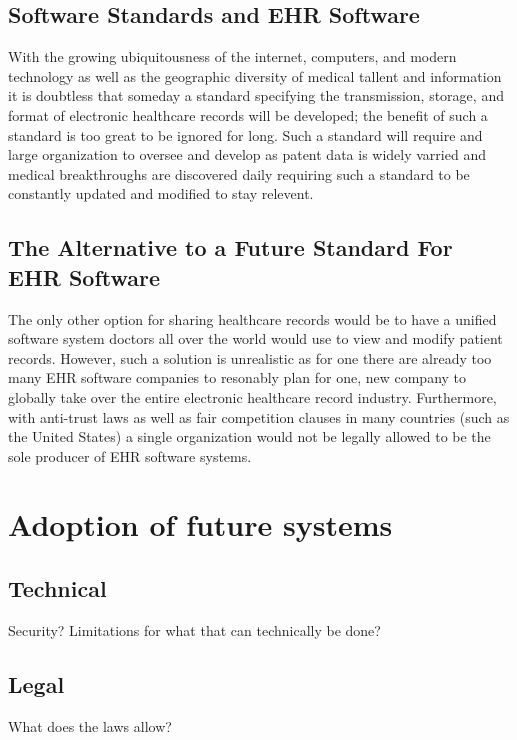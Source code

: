 \documentclass[12pt]{article}
\begin{document}
\subsection{Software Standards and EHR Software}
With the growing ubiquitousness of the internet, computers, and modern technology as well as the geographic diversity of medical tallent and information it is doubtless that someday a standard specifying the transmission, storage, and format of electronic healthcare records will be developed; the benefit of such a standard is too great to be ignored for long. Such a standard will require and large organization to oversee and develop as patent data is widely varried and medical breakthroughs are discovered daily requiring such a standard to be constantly updated and modified to stay relevent. 

\subsection{The Alternative to a Future Standard For EHR Software}
The only other option for sharing healthcare records would be to have a unified software system doctors all over the world would use to view and modify patient records. However, such a solution is unrealistic as for one there are already too many EHR software companies to resonably plan for one, new company to globally take over the entire electronic healthcare record industry. Furthermore, with anti-trust laws as well as fair competition clauses in many countries (such as the United States) a single organization would not be legally allowed to be the sole producer of EHR software systems.

\newpage

\section{Adoption of future systems}


\subsection{Technical}
Security? Limitations for what that can technically be done?


\subsection{Legal}
What does the laws allow? 
\end{document}
